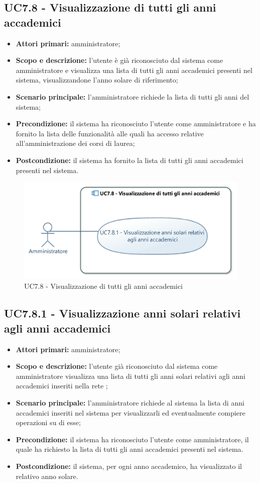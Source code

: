 \documentclass[AnalisiDeiRequisiti.tex]{subfiles}
\begin{document}
\subsection{UC7.8 - Visualizzazione di tutti gli anni accademici}
\begin{itemize}
	\item \textbf{Attori primari:} amministratore;
	\item \textbf{Scopo e descrizione:} l'utente è già riconosciuto dal sistema come amministratore e visualizza una lista di tutti gli anni accademici presenti nel sistema, visualizzandone l'anno solare di riferimento;
	\item \textbf{Scenario principale:} l'amministratore richiede la lista di tutti gli anni del sistema;
	\item \textbf{Precondizione:} il sistema ha riconosciuto l'utente come amministratore e ha fornito la lista delle funzionalità alle quali ha accesso relative all'amministrazione dei corsi di laurea;
	\item \textbf{Postcondizione:} il sistema ha fornito la lista di tutti gli anni accademici presenti nel sistema.
\end{itemize}
\begin{figure}[H]
	\centering
	\includegraphics[width=0.7\linewidth]{UC7_8.jpg}
	\caption{UC7.8 - Visualizzazione di tutti gli anni accademici}
	\label{UC7.8 - Visualizzazione di tutti gli anni accademici}
\end{figure}
\subsection{UC7.8.1 - Visualizzazione anni solari relativi agli anni accademici}
\begin{itemize}
	\item \textbf{Attori primari:} amministratore;
	\item \textbf{Scopo e descrizione:} l'utente già riconosciuto dal sistema come amministratore visualizza una lista di tutti gli anni solari relativi agli anni accademici inseriti nella rete ;
	\item \textbf{Scenario principale:} l'amministratore richiede al sistema la lista di anni accademici inseriti nel sistema per visualizzarli ed eventualmente compiere operazioni su di esse;
	\item \textbf{Precondizione:} il sistema ha riconosciuto l'utente come amministratore, il quale ha richiesto la lista di tutti gli anni accademici presenti nel sistema.
	\item \textbf{Postcondizione:} il sistema, per ogni anno accademico, ha visualizzato il relativo anno solare.
\end{itemize}
\end{document}
